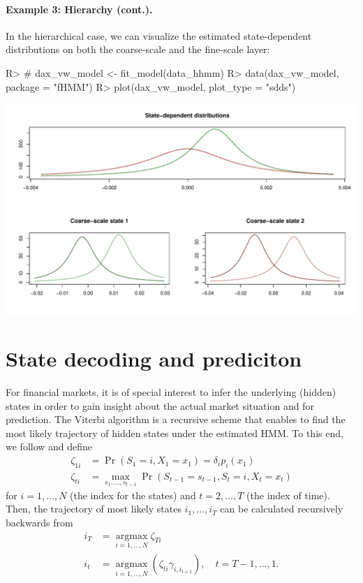 \documentclass[article]{jss}
\begin{document}
\paragraph{Example 3: Hierarchy (cont.).}

In the hierarchical case, we can visualize the estimated state-dependent distributions on both the coarse-scale and the fine-scale layer:

%
\begin{Schunk}
\begin{Sinput}
R> # dax_vw_model <- fit_model(data_hhmm)
R> data(dax_vw_model, package = "fHMM")
R> plot(dax_vw_model, plot_type = "sdds")
\end{Sinput}
\end{Schunk}
\includegraphics{fhmm_oelschlaeger_adam_michels-hhmm-sdds}
%

\section{State decoding and prediciton} \label{sec:state_decoding_and_prediction} %

For financial markets, it is of special interest to infer the underlying (hidden) states in order to gain insight about the actual market situation and for prediction. The Viterbi algorithm \citep{for73} is a recursive scheme that enables to find the most likely trajectory of hidden states under the estimated HMM. To this end, we follow \cite{zuc16} and define
\begin{align*}
  \zeta_{1i} &= \Pr(S_1 = i, X_1 = x_1) = \delta_i p_i(x_1) \\
  \zeta_{ti} &= \operatorname*{max}_{s_1, \ldots, s_{t-1}} \Pr(S_{t-1} = s_{t-1}, S_t = i, X_t = x_t)
\end{align*}
for $i = 1, \ldots, N$ (the index for the states) and $t = 2, \ldots, T$ (the index of time). Then, the trajectory of most likely states $i_1, \ldots, i_T$ can be calculated recursively backwards from
\begin{align*}
  i_T &= \operatorname*{argmax}_{i = 1, \ldots, N} \zeta_{Ti} \\
  i_t &= \operatorname*{argmax}_{i = 1, \ldots, N} (\zeta_{ti} \gamma_{i, i_{t+1}}), \quad t = T-1, \ldots, 1.
\end{align*}
\end{document}
